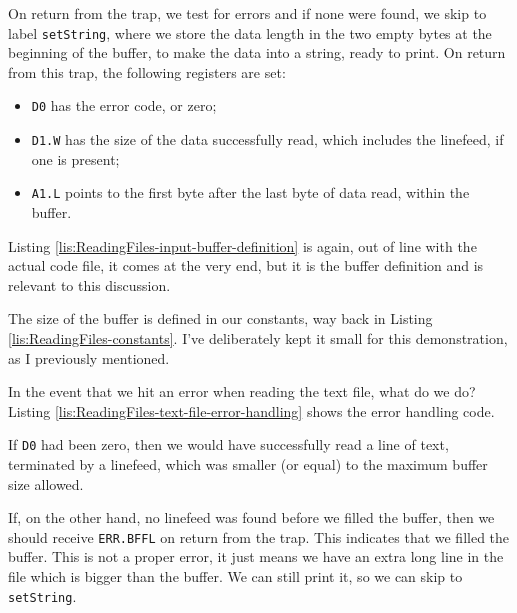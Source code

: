 On return from the trap, we test for errors and if none were found,
we skip to label \texttt{setString}, where we store the data length
in the two empty bytes at the beginning of the buffer, to make the
data into a string, ready to print. On return from this trap, the
following registers are set:
\begin{itemize}
\item \texttt{D0} has the error code, or zero;
\item \texttt{D1.W} has the size of the data successfully read, which includes
the linefeed, if one is present;
\item \texttt{A1.L} points to the first byte after the last byte of data
read, within the buffer.
\end{itemize}
Listing \ref{lis:ReadingFiles-input-buffer-definition} is again,
out of line with the actual code file, it comes at the very end, but
it is the buffer definition and is relevant to this discussion.



The size of the buffer is defined in our constants, way back in Listing
\ref{lis:ReadingFiles-constants}. I've deliberately kept it small
for this demonstration, as I previously mentioned.

In the event that we hit an error when reading the text file, what
do we do? Listing \ref{lis:ReadingFiles-text-file-error-handling}
shows the error handling code.



If \texttt{D0} had been zero, then we would have successfully read
a line of text, terminated by a linefeed, which was smaller (or equal)
to the maximum buffer size allowed. 

If, on the other hand, no linefeed was found before we filled the
buffer, then we should receive \texttt{ERR.BFFL} on return from the
trap. This indicates that we filled the buffer. This is not a proper
error, it just means we have an extra long line in the file which
is bigger than the buffer. We can still print it, so we can skip to
\texttt{setString}.

